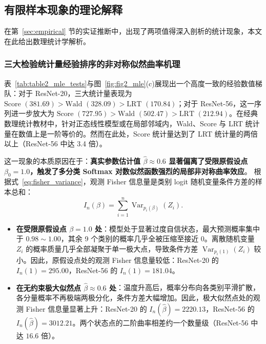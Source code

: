 \subsection{有限样本现象的理论解释}

在第~\ref{sec:empirical} 节的实证推断中，出现了两项值得深入剖析的统计现象，本文在此给出数理统计学解析。

\subsubsection{三大检验统计量经验排序的非对称似然曲率机理}

表~\ref{tab:table2_mle_tests}与图~\ref{fig:fig2_mle}(c)展现出一个高度一致的经验数值梯队：对于 ResNet-20，三大统计量表现为 $\text{Score } (381.69) > \text{Wald } (328.09) > \text{LRT } (170.84)$；对于 ResNet-56，这一序列进一步放大为 $\text{Score } (727.95) > \text{Wald } (502.47) > \text{LRT } (212.94)$。在经典数理统计教材中，针对正态线性模型或在局部邻域内，Wald、Score 与 LRT 统计量在数值上是一阶等价的。然而在此处，Score 统计量达到了 LRT 统计量的两倍以上（ResNet-56 中达 3.4 倍）。

这一现象的本质原因在于：\textbf{真实参数估计值 $\hat\beta \approx 0.6$ 显著偏离了受限原假设点 $\beta_0 = 1.0$，触发了多分类 Softmax 对数似然函数强烈的局部非对称曲率效应}。
根据式~\eqref{eq:fisher_variance}，观测 Fisher 信息量是类别 logit 随机变量条件方差的样本总和：
\[
I_n(\beta) = \sum_{i=1}^n \operatorname{Var}_{p_i(\beta)}(Z_i).
\]
\begin{itemize}
\item \textbf{在受限原假设点 $\beta = 1.0$ 处}：模型处于显著过度自信状态，最大预测概率集中于 $0.98 \sim 1.00$，其余 9 个类别的概率几乎全被压缩至接近 0。离散随机变量 $Z_i$ 的概率质量几乎全部凝聚于单一极大点，导致条件方差 $\operatorname{Var}_{p_i(1)}(Z_i)$ 较小。因此，原假设点处的观测 Fisher 信息量较低：ResNet-20 的 $I_n(1) = 295.00$，ResNet-56 的 $I_n(1) = 181.04$。
\item \textbf{在无约束极大似然点 $\hat\beta \approx 0.6$ 处}：温度升高后，概率分布向各类别平滑扩散，各分量概率不再极端两极分化，条件方差大幅增加。因此，极大似然点处的观测 Fisher 信息量显著上升：ResNet-20 的 $I_n(\hat\beta) = 2220.13$，ResNet-56 的 $I_n(\hat\beta) = 3012.21$。两个状态点的二阶曲率相差约一个数量级（ResNet-56 中达 $16.6$ 倍）。
\end{itemize}

